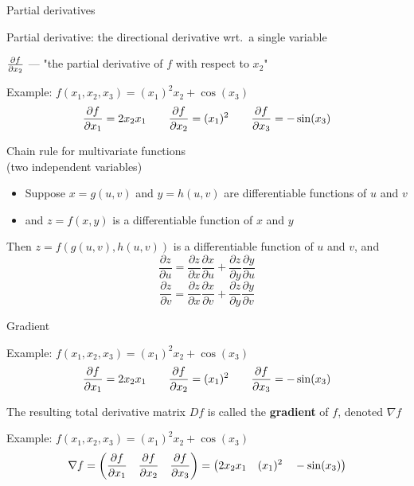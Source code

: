\documentclass[12pt,aspectratio=169,handout]{beamer}
\begin{document}
\begin{frame}{Partial derivatives}
	
	Partial derivative: the directional derivative wrt.\ a single variable
	
	\bigskip
	
	$\pdv{f}{x_2}$ --- "the partial derivative of $f$ with respect to $x_2$"
	
	\bigskip
	
	\begin{block}{Example: $f(x_1, x_2, x_3) = (x_1)^2 x_2 + \cos(x_3)$}
		$$
		\pdv{f}{x_1} = 2 x_2 x_1 \qquad \pdv{f}{x_2} = (x_1)^2 \qquad \pdv{f}{x_3} = - \sin (x_3)
		$$
	\end{block}
	
	
\end{frame}

\begin{frame}{Chain rule for multivariate functions \\ (two independent variables)}
	
\begin{itemize}
\item Suppose $x=g(u,v)$ and $y=h(u,v)$ are differentiable functions of $u$ and $v$
\item and $z=f(x,y)$ is a differentiable function of $x$ and $y$
\end{itemize}
Then $z=f(g(u,v),h(u,v))$ is a differentiable function of $u$ and $v$, and
	$$
	\frac{\partial z}{\partial u} = \frac{\partial z}{\partial x} \frac{\partial x}{\partial u} + \frac{\partial z}{\partial y} \frac{\partial y}{\partial u}
	$$
	$$
	\frac{\partial z}{\partial v} = \frac{\partial z}{\partial x} \frac{\partial x}{\partial v} + \frac{\partial z}{\partial y} \frac{\partial y}{\partial v}
	$$
	
\end{frame}

\begin{frame}{Gradient}
	
	\begin{block}{Example: $f(x_1, x_2, x_3) = (x_1)^2 x_2 + \cos(x_3)$}
		$$
		\pdv{f}{x_1} = 2 x_2 x_1 \qquad \pdv{f}{x_2} = (x_1)^2 \qquad \pdv{f}{x_3} = - \sin (x_3)
		$$
	\end{block}
	
	
	The resulting total derivative matrix $Df$ is called the \textbf{gradient} of $f$, denoted $\nabla f$
	
	\begin{block}{Example: $f(x_1, x_2, x_3) = (x_1)^2 x_2 + \cos(x_3)$}
		$$
		\nabla f = \left( \pdv{f}{x_1} \quad \pdv{f}{x_2} \quad \pdv{f}{x_3} \right) = 
		\left(
		2 x_2 x_1  \quad (x_1)^2  \quad - \sin (x_3)
		\right)
		$$
	\end{block}
	
	
\end{frame}
\end{document}

